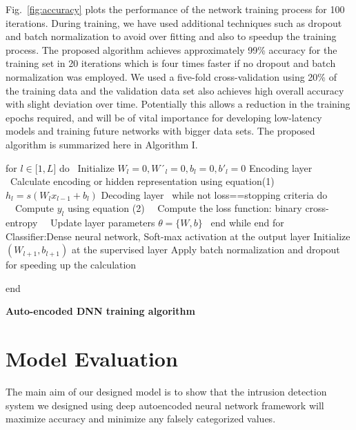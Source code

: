 \documentclass[runningheads]{llncs}
\newcommand{\fig}[1]{Fig.~\ref{#1}}
\begin{document}
\fig{fig:accuracy} plots the performance of the network training process for 100 iterations. During training, we have used additional techniques such as dropout and batch normalization to avoid over fitting and also to speedup the training process. The proposed algorithm   achieves approximately 99\% accuracy for the training set in 20 iterations which is four times faster if no dropout and batch normalization was employed. We used a five-fold cross-validation using 20\% of the training data and the validation data set also achieves high overall accuracy with slight deviation over time. Potentially this allows a reduction in the training epochs required, and will be of vital importance for developing low-latency models and training future networks with bigger data sets.
The proposed algorithm is summarized here in Algorithm I.


\begin{algorithm}[h]\label{algorithm}

\nl for $l \in\mathcal [1, L]$ do\;
\nl \ Initialize $ W_l = 0, W´_l = 0, b_l = 0, b'_{l} = 0$\;
 {Encoding layer}\;
\nl \ Calculate encoding or hidden representation using equation(1)\;
\ \  \ \ \  $ h_{l} = s(W_{l}x_{l−1} + b_{l})$\;
{Decoding layer}\;
\nl\ while not loss==stopping criteria do\;
\nl \ \ Compute $y_{l}$ using equation (2)\;
\nl \ \ Compute the loss function: binary cross-entropy\;
\nl\ \ Update layer parameters  $\theta = \{W, b\}$\;
\nl \ end while\;
\nl end for\;
{Classifier:Dense neural network, Soft-max activation at the output layer}\;
\nl Initialize $(W_{l+1}, b_{l+1})$ at the supervised layer\;
\;
\nl Apply batch normalization and dropout for speeding up the calculation\;

\nl  end\;
    {\caption{\bf Auto-encoded DNN training algorithm} \label{Algorithm}
    }
\end{algorithm}


\section{Model Evaluation} \label{sec:evaluation}


The main aim of our designed model is to show that the intrusion detection system we designed using deep autoencoded neural network framework will maximize accuracy  and minimize any falsely categorized values.
\end{document}
